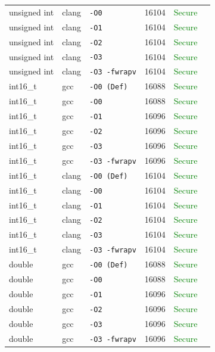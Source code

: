 \begin{table}[htbp]
\begin{tabular}{@{}lllcrl@{}}
unsigned int & clang & \texttt{-O0} & 16104 & \textcolor{green}{Secure}} \\
unsigned int & clang & \texttt{-O1} & 16104 & \textcolor{green}{Secure}} \\
unsigned int & clang & \texttt{-O2} & 16104 & \textcolor{green}{Secure}} \\
unsigned int & clang & \texttt{-O3} & 16104 & \textcolor{green}{Secure}} \\
unsigned int & clang & \texttt{-O3 -fwrapv} & 16104 & \textcolor{green}{Secure}} \\
\midrule
int16\_t & gcc & \texttt{-O0 (Def)} & 16088 & \textcolor{green}{Secure}} \\
int16\_t & gcc & \texttt{-O0} & 16088 & \textcolor{green}{Secure}} \\
int16\_t & gcc & \texttt{-O1} & 16096 & \textcolor{green}{Secure}} \\
int16\_t & gcc & \texttt{-O2} & 16096 & \textcolor{green}{Secure}} \\
int16\_t & gcc & \texttt{-O3} & 16096 & \textcolor{green}{Secure}} \\
int16\_t & gcc & \texttt{-O3 -fwrapv} & 16096 & \textcolor{green}{Secure}} \\
int16\_t & clang & \texttt{-O0 (Def)} & 16104 & \textcolor{green}{Secure}} \\
int16\_t & clang & \texttt{-O0} & 16104 & \textcolor{green}{Secure}} \\
int16\_t & clang & \texttt{-O1} & 16104 & \textcolor{green}{Secure}} \\
int16\_t & clang & \texttt{-O2} & 16104 & \textcolor{green}{Secure}} \\
int16\_t & clang & \texttt{-O3} & 16104 & \textcolor{green}{Secure}} \\
int16\_t & clang & \texttt{-O3 -fwrapv} & 16104 & \textcolor{green}{Secure}} \\
\midrule
double & gcc & \texttt{-O0 (Def)} & 16088 & \textcolor{green}{Secure}} \\
double & gcc & \texttt{-O0} & 16088 & \textcolor{green}{Secure}} \\
double & gcc & \texttt{-O1} & 16096 & \textcolor{green}{Secure}} \\
double & gcc & \texttt{-O2} & 16096 & \textcolor{green}{Secure}} \\
double & gcc & \texttt{-O3} & 16096 & \textcolor{green}{Secure}} \\
double & gcc & \texttt{-O3 -fwrapv} & 16096 & \textcolor{green}{Secure}} \\

\end{tabular}
\end{table}
